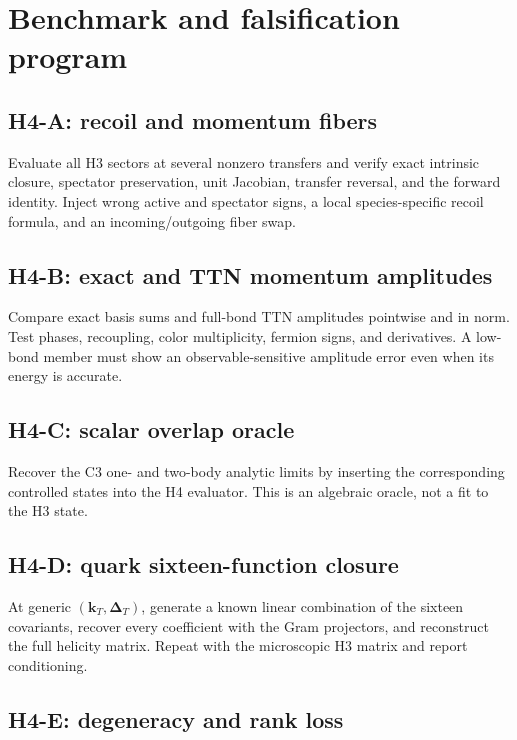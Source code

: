 \documentclass[11pt]{article}
\newcommand{\kT}{\bm{k}_{T}}
\newcommand{\DT}{\bm{\Delta}_{T}}
\begin{document}
\section{Benchmark and falsification program}
\label{sec:benchmarks}

\subsection{H4-A: recoil and momentum fibers}

Evaluate all H3 sectors at several nonzero transfers and verify exact
intrinsic closure, spectator preservation, unit Jacobian, transfer reversal,
and the forward identity.  Inject wrong active and spectator signs, a local
species-specific recoil formula, and an incoming/outgoing fiber swap.

\subsection{H4-B: exact and TTN momentum amplitudes}

Compare exact basis sums and full-bond TTN amplitudes pointwise and in norm.
Test phases, recoupling, color multiplicity, fermion signs, and derivatives.
A low-bond member must show an observable-sensitive amplitude error even when
its energy is accurate.

\subsection{H4-C: scalar overlap oracle}

Recover the C3 one- and two-body analytic limits by inserting the corresponding
controlled states into the H4 evaluator.  This is an algebraic oracle, not a
fit to the H3 state.

\subsection{H4-D: quark sixteen-function closure}

At generic \((\kT,\DT)\), generate a known linear combination of the sixteen
covariants, recover every coefficient with the Gram projectors, and reconstruct
the full helicity matrix.  Repeat with the microscopic H3 matrix and report
conditioning.

\subsection{H4-E: degeneracy and rank loss}
\end{document}
